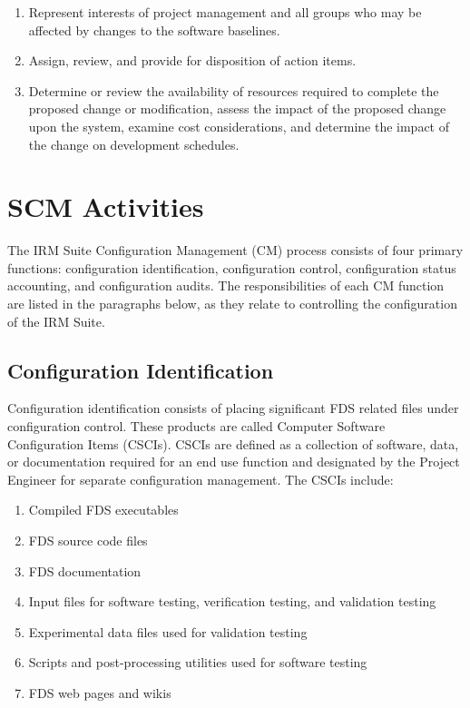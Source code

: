 \documentclass[11pt]{book}
\begin{document}
\begin{enumerate}

\item Represent interests of project management and all groups who may be affected by changes
to the software baselines. 

\item Assign, review, and provide for disposition of action items.

\item Determine or review the availability of resources required to complete the proposed change or
modification, assess the impact of the proposed change upon the system, examine cost considerations,
and determine the impact of the change on development schedules.

\end{enumerate}

\chapter{SCM Activities}

The IRM Suite Configuration Management (CM) process consists of four primary functions: configuration
identification, configuration control, configuration status accounting, and configuration audits.
The responsibilities of each CM function are listed in the paragraphs below, as they relate to
controlling the configuration of the IRM Suite.

\section{Configuration Identification}

Configuration identification consists of placing significant FDS related files under configuration control.
These products are called Computer Software Configuration Items (CSCIs).  CSCIs are defined as a collection
of software, data, or documentation required for an end use function and designated by the Project Engineer
for separate configuration management.  The CSCIs include:

\begin{enumerate}

\item Compiled FDS executables
\item FDS source code files
\item FDS documentation
\item Input files for software testing, verification testing, and validation testing
\item Experimental data files used for validation testing
\item Scripts and post-processing utilities used for software testing
\item FDS web pages and wikis

\end{enumerate}
\end{document}
